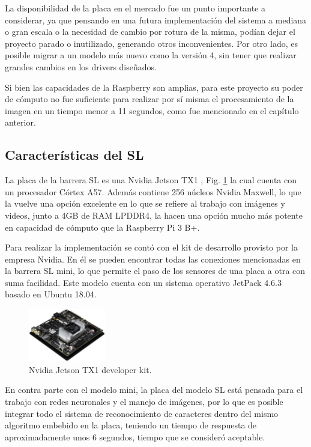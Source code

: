 La disponibilidad de la placa en el mercado fue un punto importante a considerar, ya que pensando en una futura
implementación del sistema a mediana o gran escala o la necesidad de cambio por rotura de la misma, podían dejar el
proyecto parado o inutilizado, generando otros inconvenientes. Por otro lado, es posible migrar a un modelo más nuevo como la versión 4, sin tener que realizar grandes cambios en los drivers diseñados.

Si bien las capacidades de la Raspberry son amplias, para este proyecto su poder de cómputo no fue suficiente para realizar por sí misma el procesamiento de la imagen en un tiempo menor a 11 segundos, como fue mencionado en el capítulo anterior.

\subsection{Características del SL}

La placa de la barrera SL es una Nvidia Jetson TX1 \cite{nvidia_manual_nodate}, Fig. \ref{fig:JTX1} la cual cuenta con un procesador Córtex A57. Además contiene 256 núcleos Nvidia Maxwell, lo que la vuelve una opción excelente en lo que se refiere al trabajo con imágenes y videos, junto a 4GB de RAM LPDDR4, la hacen una opción mucho más potente en capacidad de cómputo que la Raspberry Pi 3 B+.

Para realizar la implementación se contó con el kit de desarrollo provisto por la empresa Nvidia. En él se pueden encontrar todas las conexiones mencionadas en la barrera SL mini, lo que permite el paso de los sensores de una placa a otra con suma facilidad.
Este modelo cuenta con un sistema operativo JetPack 4.6.3 basado en Ubuntu 18.04.

\begin{figure}
    \centering
    \includegraphics[width=0.3\textwidth]{imgs/JTX1-developerkit.png}
    \caption{Nvidia Jetson TX1 developer kit.}
    \label{fig:JTX1}
\end{figure}


En contra parte con el modelo mini, la placa del modelo SL está pensada para el trabajo con redes neuronales y el manejo de imágenes, por lo que es posible integrar todo el sistema de reconocimiento de caracteres dentro del mismo algoritmo embebido en la placa, teniendo un tiempo de respuesta de aproximadamente unos 6 segundos, tiempo que se consideró aceptable.

